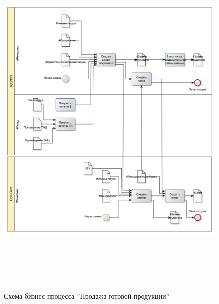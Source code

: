 \begin{figure}[!htb]
\centering
  \includegraphics[width=180mm, height=180mm, angle=90, keepaspectratio]{50_Pics/2_Sales.pdf}
\caption{Схема бизнес-процесса ''Продажа готовой продукции''}
\label{pic:2_Sales}
\end{figure} 

\clearpage



